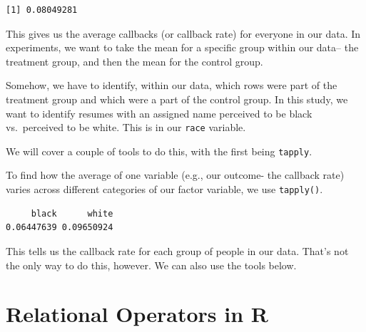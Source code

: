 \documentclass[
  letterpaper,
  DIV=11,
  numbers=noendperiod]{scrreprt}
\newenvironment{Shaded}{\begin{snugshade}}{\end{snugshade}}
\newcommand{\AttributeTok}[1]{\textcolor[rgb]{0.40,0.45,0.13}{#1}}
\newcommand{\DocumentationTok}[1]{\textcolor[rgb]{0.37,0.37,0.37}{\textit{#1}}}
\newcommand{\FunctionTok}[1]{\textcolor[rgb]{0.28,0.35,0.67}{#1}}
\newcommand{\NormalTok}[1]{\textcolor[rgb]{0.00,0.23,0.31}{#1}}
\newcommand{\SpecialCharTok}[1]{\textcolor[rgb]{0.37,0.37,0.37}{#1}}
\begin{document}
\begin{Shaded}
\end{Shaded}

\begin{verbatim}
[1] 0.08049281
\end{verbatim}

This gives us the average callbacks (or callback rate) for everyone in
our data. In experiments, we want to take the mean for a specific group
within our data-- the treatment group, and then the mean for the control
group.

Somehow, we have to identify, within our data, which rows were part of
the treatment group and which were a part of the control group. In this
study, we want to identify resumes with an assigned name perceived to be
black vs.~perceived to be white. This is in our \texttt{race} variable.

We will cover a couple of tools to do this, with the first being
\texttt{tapply}.

To find how the average of one variable (e.g., our outcome- the callback
rate) varies across different categories of our factor variable, we use
\texttt{tapply()}.

\begin{Shaded}
\end{Shaded}

\begin{verbatim}
     black      white 
0.06447639 0.09650924 
\end{verbatim}

This tells us the callback rate for each group of people in our data.
That's not the only way to do this, however. We can also use the tools
below.

\hypertarget{relational-operators-in-r}{%
\section{Relational Operators in R}\label{relational-operators-in-r}}
\end{document}
